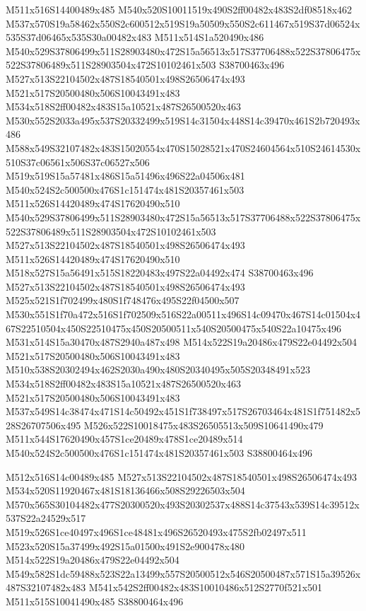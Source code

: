 \documentclass{article}
\begin{document}
\begin{multicols}{2}
M511x516S14400489x485 M540x520S10011519x490S2ff00482x483S2df08518x462 M537x570S19a58462x550S2c600512x519S19a50509x550S2c611467x519S37d06524x535S37d06465x535S30a00482x483 M511x514S1a520490x486 M540x529S37806499x511S28903480x472S15a56513x517S37706488x522S37806475x522S37806489x511S28903504x472S10102461x503 S38700463x496 M527x513S22104502x487S18540501x498S26506474x493 M521x517S20500480x506S10043491x483 M534x518S2ff00482x483S15a10521x487S26500520x463 M530x552S2033a495x537S20332499x519S14c31504x448S14c39470x461S2b720493x486 M588x549S32107482x483S15020554x470S15028521x470S24604564x510S24614530x510S37c06561x506S37c06527x506 M519x519S15a57481x486S15a51496x496S22a04506x481 M540x524S2c500500x476S1c151474x481S20357461x503 M511x526S14420489x474S17620490x510 M540x529S37806499x511S28903480x472S15a56513x517S37706488x522S37806475x522S37806489x511S28903504x472S10102461x503 M527x513S22104502x487S18540501x498S26506474x493 M511x526S14420489x474S17620490x510 M518x527S15a56491x515S18220483x497S22a04492x474 S38700463x496 M527x513S22104502x487S18540501x498S26506474x493 M525x521S1f702499x480S1f748476x495S22f04500x507 M530x551S1f70a472x516S1f702509x516S22a00511x496S14c09470x467S14c01504x467S22510504x450S22510475x450S20500511x540S20500475x540S22a10475x496 M531x514S15a30470x487S2940a487x498 M514x522S19a20486x479S22e04492x504 M521x517S20500480x506S10043491x483 M510x538S20302494x462S2030a490x480S20340495x505S20348491x523 M534x518S2ff00482x483S15a10521x487S26500520x463 M521x517S20500480x506S10043491x483 M537x549S14c38474x471S14c50492x451S1f738497x517S26703464x481S1f751482x528S26707506x495 M526x522S10018475x483S26505513x509S10641490x479 M511x544S17620490x457S1ce20489x478S1ce20489x514 M540x524S2c500500x476S1c151474x481S20357461x503 S38800464x496

M512x516S14c00489x485 M527x513S22104502x487S18540501x498S26506474x493 M534x520S11920467x481S18136466x508S29226503x504 M570x565S30104482x477S20300520x493S20302537x488S14c37543x539S14c39512x537S22a24529x517 M519x526S1ce40497x496S1ce48481x496S26520493x475S2fb02497x511 M523x520S15a37499x492S15a01500x491S2e900478x480 M514x522S19a20486x479S22e04492x504 M549x582S1dc59488x523S22a13499x557S20500512x546S20500487x571S15a39526x487S32107482x483 M541x542S2ff00482x483S10010486x512S2770f521x501 M511x515S10041490x485 S38800464x496


\end{multicols}
\end{document}
